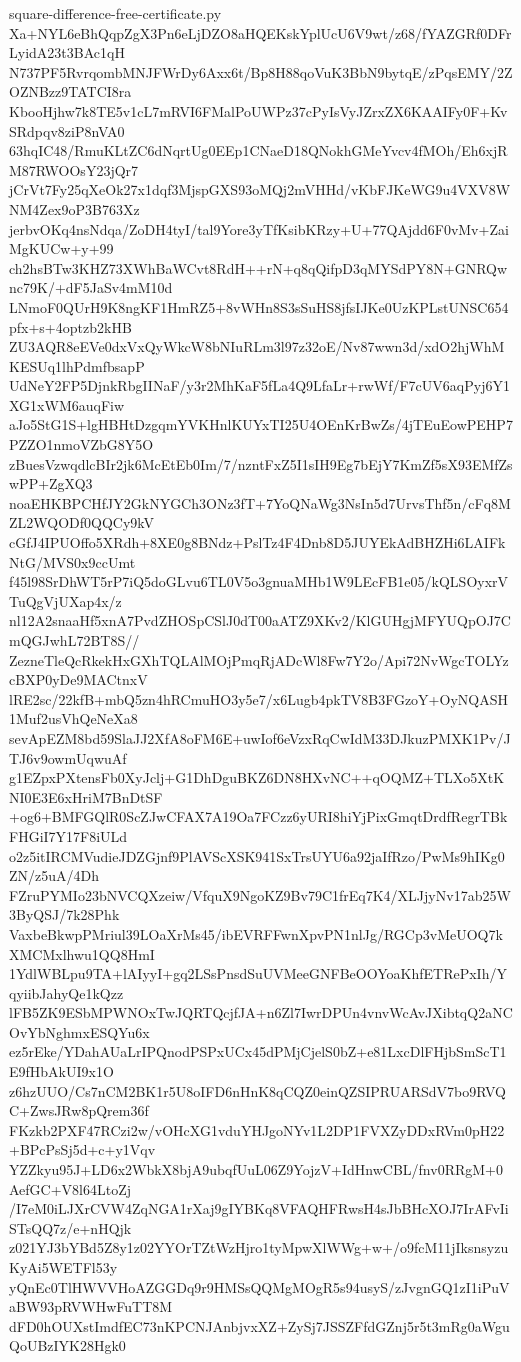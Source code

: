 \documentclass[11pt]{article}
\theoremstyle{definition}
\theoremstyle{remark}
\begin{document}
\begin{filecontents*}[overwrite]{square-difference-free-certificate.py}
Xa+NYL6eBhQqpZgX3Pn6eLjDZO8aHQEKskYplUcU6V9wt/z68/fYAZGRf0DFrLyidA23t3BAc1qH
N737PF5RvrqombMNJFWrDy6Axx6t/Bp8H88qoVuK3BbN9bytqE/zPqsEMY/2ZOZNBzz9TATCI8ra
KbooHjhw7k8TE5v1cL7mRVI6FMalPoUWPz37cPyIsVyJZrxZX6KAAIFy0F+KvSRdpqv8ziP8nVA0
63hqIC48/RmuKLtZC6dNqrtUg0EEp1CNaeD18QNokhGMeYvcv4fMOh/Eh6xjRM87RWOOsY23jQr7
jCrVt7Fy25qXeOk27x1dqf3MjspGXS93oMQj2mVHHd/vKbFJKeWG9u4VXV8WNM4Zex9oP3B763Xz
jerbvOKq4nsNdqa/ZoDH4tyI/tal9Yore3yTfKsibKRzy+U+77QAjdd6F0vMv+ZaiMgKUCw+y+99
ch2hsBTw3KHZ73XWhBaWCvt8RdH++rN+q8qQifpD3qMYSdPY8N+GNRQwnc79K/+dF5JaSv4mM10d
LNmoF0QUrH9K8ngKF1HmRZ5+8vWHn8S3sSuHS8jfsIJKe0UzKPLstUNSC654pfx+s+4optzb2kHB
ZU3AQR8eEVe0dxVxQyWkcW8bNIuRLm3l97z32oE/Nv87wwn3d/xdO2hjWhMKESUq1lhPdmfbsapP
UdNeY2FP5DjnkRbgIINaF/y3r2MhKaF5fLa4Q9LfaLr+rwWf/F7cUV6aqPyj6Y1XG1xWM6auqFiw
aJo5StG1S+lgHBHtDzgqmYVKHnlKUYxTI25U4OEnKrBwZs/4jTEuEowPEHP7PZZO1nmoVZbG8Y5O
zBuesVzwqdlcBIr2jk6McEtEb0Im/7/nzntFxZ5I1sIH9Eg7bEjY7KmZf5sX93EMfZswPP+ZgXQ3
noaEHKBPCHfJY2GkNYGCh3ONz3fT+7YoQNaWg3NsIn5d7UrvsThf5n/cFq8MZL2WQODf0QQCy9kV
cGfJ4IPUOffo5XRdh+8XE0g8BNdz+PslTz4F4Dnb8D5JUYEkAdBHZHi6LAIFkNtG/MVS0x9ccUmt
f45l98SrDhWT5rP7iQ5doGLvu6TL0V5o3gnuaMHb1W9LEcFB1e05/kQLSOyxrVTuQgVjUXap4x/z
nl12A2snaaHf5xnA7PvdZHOSpCSlJ0dT00aATZ9XKv2/KlGUHgjMFYUQpOJ7CmQGJwhL72BT8S//
ZezneTleQcRkekHxGXhTQLAlMOjPmqRjADcWl8Fw7Y2o/Api72NvWgcTOLYzcBXP0yDe9MACtnxV
lRE2sc/22kfB+mbQ5zn4hRCmuHO3y5e7/x6Lugb4pkTV8B3FGzoY+OyNQASH1Muf2usVhQeNeXa8
sevApEZM8bd59SlaJJ2XfA8oFM6E+uwIof6eVzxRqCwIdM33DJkuzPMXK1Pv/JTJ6v9owmUqwuAf
g1EZpxPXtensFb0XyJclj+G1DhDguBKZ6DN8HXvNC++qOQMZ+TLXo5XtKNI0E3E6xHriM7BnDtSF
+og6+BMFGQlR0ScZJwCFAX7A19Oa7FCzz6yURI8hiYjPixGmqtDrdfRegrTBkFHGiI7Y17F8iULd
o2z5itIRCMVudieJDZGjnf9PlAVScXSK941SxTrsUYU6a92jaIfRzo/PwMs9hIKg0ZN/z5uA/4Dh
FZruPYMIo23bNVCQXzeiw/VfquX9NgoKZ9Bv79C1frEq7K4/XLJjyNv17ab25W3ByQSJ/7k28Phk
VaxbeBkwpPMriul39LOaXrMs45/ibEVRFFwnXpvPN1nlJg/RGCp3vMeUOQ7kXMCMxlhwu1QQ8HmI
1YdlWBLpu9TA+lAIyyI+gq2LSsPnsdSuUVMeeGNFBeOOYoaKhfETRePxIh/YqyiibJahyQe1kQzz
lFB5ZK9ESbMPWNOxTwJQRTQcjfJA+n6Zl7IwrDPUn4vnvWcAvJXibtqQ2aNCOvYbNghmxESQYu6x
ez5rEke/YDahAUaLrIPQnodPSPxUCx45dPMjCjelS0bZ+e81LxcDlFHjbSmScT1E9fHbAkUI9x1O
z6hzUUO/Cs7nCM2BK1r5U8oIFD6nHnK8qCQZ0einQZSIPRUARSdV7bo9RVQC+ZwsJRw8pQrem36f
FKzkb2PXF47RCzi2w/vOHcXG1vduYHJgoNYv1L2DP1FVXZyDDxRVm0pH22+BPcPsSj5d+c+y1Vqv
YZZkyu95J+LD6x2WbkX8bjA9ubqfUuL06Z9YojzV+IdHnwCBL/fnv0RRgM+0AefGC+V8l64LtoZj
/I7eM0iLJXrCVW4ZqNGA1rXaj9gIYBKq8VFAQHFRwsH4sJbBHcXOJ7IrAFvIiSTsQQ7z/e+nHQjk
z021YJ3bYBd5Z8y1z02YYOrTZtWzHjro1tyMpwXlWWg+w+/o9fcM11jIksnsyzuKyAi5WETFl53y
yQnEc0TlHWVVHoAZGGDq9r9HMSsQQMgMOgR5s94usyS/zJvgnGQ1zI1iPuVaBW93pRVWHwFuTT8M
dFD0hOUXstImdfEC73nKPCNJAnbjvxXZ+ZySj7JSSZFfdGZnj5r5t3mRg0aWguQoUBzIYK28Hgk0

\end{filecontents*}
\end{document}
